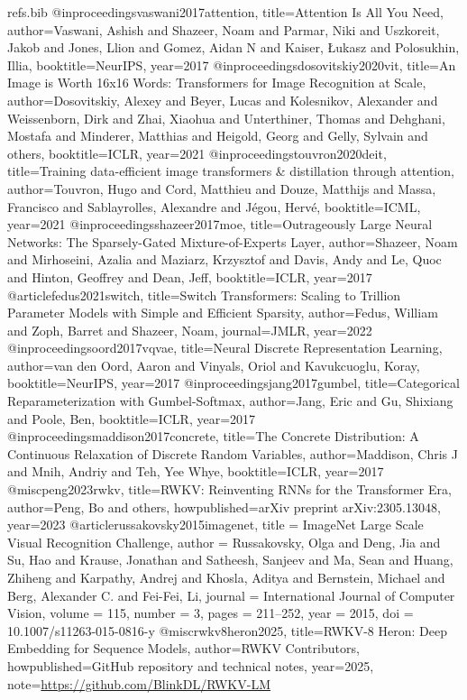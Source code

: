 \documentclass[11pt]{article}
\begin{document}
\begin{filecontents*}{refs.bib}
@inproceedings{vaswani2017attention,
  title={Attention Is All You Need},
  author={Vaswani, Ashish and Shazeer, Noam and Parmar, Niki and Uszkoreit, Jakob and Jones, Llion and Gomez, Aidan N and Kaiser, {\L}ukasz and Polosukhin, Illia},
  booktitle={NeurIPS},
  year={2017}
}
@inproceedings{dosovitskiy2020vit,
  title={An Image is Worth 16x16 Words: Transformers for Image Recognition at Scale},
  author={Dosovitskiy, Alexey and Beyer, Lucas and Kolesnikov, Alexander and Weissenborn, Dirk and Zhai, Xiaohua and Unterthiner, Thomas and Dehghani, Mostafa and Minderer, Matthias and Heigold, Georg and Gelly, Sylvain and others},
  booktitle={ICLR},
  year={2021}
}
@inproceedings{touvron2020deit,
  title={Training data-efficient image transformers \& distillation through attention},
  author={Touvron, Hugo and Cord, Matthieu and Douze, Matthijs and Massa, Francisco and Sablayrolles, Alexandre and J{\'e}gou, Herv{\'e}},
  booktitle={ICML},
  year={2021}
}
@inproceedings{shazeer2017moe,
  title={Outrageously Large Neural Networks: The Sparsely-Gated Mixture-of-Experts Layer},
  author={Shazeer, Noam and Mirhoseini, Azalia and Maziarz, Krzysztof and Davis, Andy and Le, Quoc and Hinton, Geoffrey and Dean, Jeff},
  booktitle={ICLR},
  year={2017}
}
@article{fedus2021switch,
  title={Switch Transformers: Scaling to Trillion Parameter Models with Simple and Efficient Sparsity},
  author={Fedus, William and Zoph, Barret and Shazeer, Noam},
  journal={JMLR},
  year={2022}
}
@inproceedings{oord2017vqvae,
  title={Neural Discrete Representation Learning},
  author={van den Oord, Aaron and Vinyals, Oriol and Kavukcuoglu, Koray},
  booktitle={NeurIPS},
  year={2017}
}
@inproceedings{jang2017gumbel,
  title={Categorical Reparameterization with Gumbel-Softmax},
  author={Jang, Eric and Gu, Shixiang and Poole, Ben},
  booktitle={ICLR},
  year={2017}
}
@inproceedings{maddison2017concrete,
  title={The Concrete Distribution: A Continuous Relaxation of Discrete Random Variables},
  author={Maddison, Chris J and Mnih, Andriy and Teh, Yee Whye},
  booktitle={ICLR},
  year={2017}
}
@misc{peng2023rwkv,
  title={{RWKV}: Reinventing {RNN}s for the Transformer Era},
  author={Peng, Bo and others},
  howpublished={arXiv preprint arXiv:2305.13048},
  year={2023}
}
@article{russakovsky2015imagenet,
  title   = {ImageNet Large Scale Visual Recognition Challenge},
  author  = {Russakovsky, Olga and Deng, Jia and Su, Hao and Krause, Jonathan and Satheesh, Sanjeev and Ma, Sean and Huang, Zhiheng and Karpathy, Andrej and Khosla, Aditya and Bernstein, Michael and Berg, Alexander C. and Fei-Fei, Li},
  journal = {International Journal of Computer Vision},
  volume  = {115},
  number  = {3},
  pages   = {211--252},
  year    = {2015},
  doi     = {10.1007/s11263-015-0816-y}
}
@misc{rwkv8heron2025,
  title={{RWKV-8 Heron}: Deep Embedding for Sequence Models},
  author={{RWKV Contributors}},
  howpublished={GitHub repository and technical notes},
  year={2025},
  note={\url{https://github.com/BlinkDL/RWKV-LM}}
}
\end{filecontents*}



\end{document}
